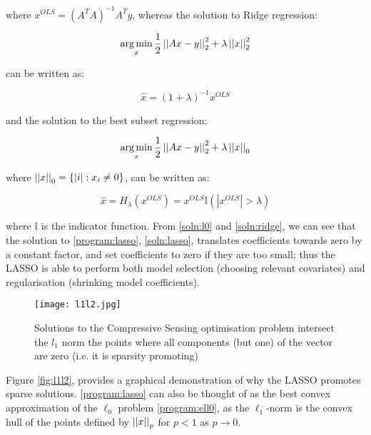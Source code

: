 where \(x^{OLS} = (A^TA)^{-1}A^Ty \), whereas the solution to Ridge regression:

\begin{equation}
\operatorname*{arg\,min}_x \frac{1}{2}\left|\left|Ax-y\right|\right|_2^2 + \lambda\left|\left|x\right|\right|_2^2
\label{program:ridge}
\end{equation}

can be written as:

\begin{equation}
\hat{x} = \left(1+\lambda\right)^{-1}x^{OLS}
\label{soln:ridge}
\end{equation}

and the solution to the best subset regression:

\begin{equation}
\operatorname*{arg\,min}_x \frac{1}{2}\left|\left|Ax-y\right|\right|_2^2 + \lambda\left|\left|x\right|\right|_0
\label{program:ell0}
\end{equation}

where \( \left|\left|x\right|\right|_0 = \{ |i| : x_i \neq 0 \} \), can be written as:

\begin{equation}
\hat{x} = H_{\lambda}\left(x^{OLS}\right) = x^{OLS} \mathbb{I}\left(|x^{OLS}| > \lambda\right)
\label{soln:l0}
\end{equation} 

where \(\mathbb{I}\) is the indicator function. From \eqref{soln:l0} and \eqref{soln:ridge}, we can see that the solution to \eqref{program:lasso}, \eqref{soln:lasso}, translates coefficients towards zero by a constant factor, and set coefficients to zero if they are too small; thus the LASSO is able to perform both model selection (choosing relevant covariates) and regularisation (shrinking model coefficients). 

\begin{figure*}[h]
\centering
\texttt{[image: l1l2.jpg]}
\caption{Solutions to the Compressive Sensing optimisation problem intersect the \(l_1\) norm the points where all components (but one) of the vector are zero (i.e. it is sparsity promoting) \cite{Tibshirani1996}}
\label{fig:l1l2}
\end{figure*}

Figure \eqref{fig:l1l2}, provides a graphical demonstration of why the LASSO promotes sparse solutions. \eqref{program:lasso} can also be thought of as the best convex approximation of the \(\ell_0\) problem \eqref{program:ell0}, as the \(\ell_1\)-norm is the convex hull of the points defined by \(\left|\left|x\right|\right|_p\) for \(p < 1\) as \(p \rightarrow 0\). 

